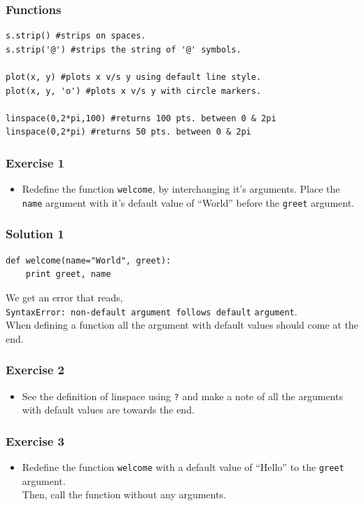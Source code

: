 \documentclass[presentation]{beamer}
\begin{document}
\begin{frame}[fragile]
\frametitle{Functions}
\label{sec-4}

\lstset{language=Python}
\begin{lstlisting}
s.strip() #strips on spaces. 
s.strip('@') #strips the string of '@' symbols.

plot(x, y) #plots x v/s y using default line style. 
plot(x, y, 'o') #plots x v/s y with circle markers. 

linspace(0,2*pi,100) #returns 100 pts. between 0 & 2pi
linspace(0,2*pi) #returns 50 pts. between 0 & 2pi
\end{lstlisting}
\end{frame}
\begin{frame}
\frametitle{Exercise 1}
\label{sec-5}


\begin{itemize}
\item Redefine the function \verb~welcome~, by interchanging it's
  arguments.
\vspace{3pt}  
  Place the \verb~name~ argument with it's default value of
  ``World'' before the \verb~greet~ argument.
\end{itemize}
\end{frame}
\begin{frame}[fragile]
\frametitle{Solution 1}
\label{sec-6}

\lstset{language=Python}
\begin{lstlisting}
def welcome(name="World", greet):
    print greet, name
\end{lstlisting}
\vspace{5pt}
  We get an error that reads, \\ \verb~SyntaxError: non-default argument follows default~ 
\verb~argument~.
\vspace{5pt}
\\ When defining a function all the
  argument with default values should come at the end.
\end{frame}
\begin{frame}
\frametitle{Exercise 2}
\label{sec-7}


\begin{itemize}
\item See the definition of linspace using \verb~?~ and make a note of all the
  arguments with default values are towards the end.
\end{itemize}
\end{frame}
\begin{frame}
\frametitle{Exercise 3}
\label{sec-8}


\begin{itemize}
\item Redefine the function \verb~welcome~ with a default value of
  ``Hello'' to the \verb~greet~ argument.\\ 
  Then, call the function without any arguments.
\end{itemize}
\end{frame}
\end{document}
